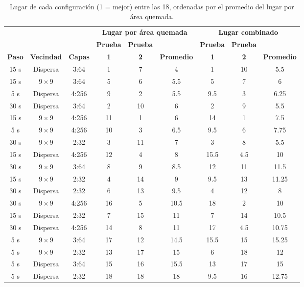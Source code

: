 	\begin{table}[htbp]
		\centering
		\footnotesize
		\setlength{\tabcolsep}{3pt}
		\begin{tabular}{ccccccccc}
			\toprule
			& & & \multicolumn{3}{c}{\textbf{Lugar por área quemada}} & \multicolumn{3}{c}{\textbf{Lugar combinado}} \\
			\cmidrule(lr){4-6} \cmidrule(lr){7-9}
			& & & \textbf{Prueba} & \textbf{Prueba} & & \textbf{Prueba} & \textbf{Prueba} & \\
			\textbf{Paso} & \textbf{Vecindad} & \textbf{Capas} & \textbf{1} & \textbf{2} & \textbf{Promedio} & \textbf{1} & \textbf{2} & \textbf{Promedio} \\ \midrule
			15 s & Dispersa & 3:64 & 1 & 7 & 4 & 1 & 10 & 5.5 \\
			15 s & $9 \times 9$ & 3:64 & 5 & 6 & 5.5 & 5 & 7 & 6 \\
			5 s & Dispersa & 4:256 & 9 & 2 & 5.5 & 9.5 & 3 & 6.25 \\
			30 s & Dispersa & 3:64 & 2 & 10 & 6 & 2 & 9 & 5.5 \\
			15 s & $9 \times 9$ & 4:256 & 11 & 1 & 6 & 14 & 1 & 7.5 \\
			5 s & $9 \times 9$ & 4:256 & 10 & 3 & 6.5 & 9.5 & 6 & 7.75 \\
			30 s & $9 \times 9$ & 2:32 & 3 & 11 & 7 & 3 & 8 & 5.5 \\
			15 s & Dispersa & 4:256 & 12 & 4 & 8 & 15.5 & 4.5 & 10 \\
			30 s & $9 \times 9$ & 3:64 & 8 & 9 & 8.5 & 12 & 11 & 11.5 \\
			15 s & $9 \times 9$ & 2:32 & 4 & 14 & 9 & 9.5 & 13 & 11.25 \\
			30 s & Dispersa & 2:32 & 6 & 13 & 9.5 & 4 & 12 & 8 \\
			30 s & $9 \times 9$ & 4:256 & 16 & 5 & 10.5 & 18 & 2 & 10 \\
			15 s & Dispersa & 2:32 & 7 & 15 & 11 & 7 & 14 & 10.5 \\
			30 s & Dispersa & 4:256 & 14 & 8 & 11 & 17 & 4.5 & 10.75 \\
			5 s & $9 \times 9$ & 3:64 & 17 & 12 & 14.5 & 15.5 & 15 & 15.25 \\
			5 s & $9 \times 9$ & 2:32 & 13 & 17 & 15 & 6 & 18 & 12 \\
			5 s & Dispersa & 3:64 & 15 & 16 & 15.5 & 13 & 17 & 15 \\
			5 s & Dispersa & 2:32 & 18 & 18 & 18 & 9.5 & 16 & 12.75 \\ \bottomrule
		\end{tabular}
		\caption{Lugar de cada configuración (1 = mejor) entre las 18, ordenadas por el promedio del lugar por área quemada.}
		\label{tab:flame_18_lugares}
	\end{table}

